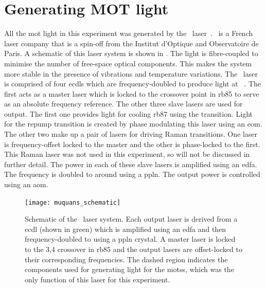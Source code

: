 \section{Generating MOT light}\label{sec:muquans_light}
 All the \ac{mot} light in this experiment was generated by the
 \Muquans\
laser~\cite{muquansWebPage}. \Muquans\ is a French laser company that is a
spin-off from the Institut d'Optique and Observatoire de Paris. A
schematic of
this laser system is shown in . The
light is fibre-coupled to minimise the number of free-space optical components.
This makes the system more stable in the presence of vibrations and
temperature variations. The \Muquans\ laser is comprised of four
\sivalue{1560}{\nano\metre} \acp{ecdl} which are frequency-doubled to produce
light at
~\cite{Menoret2011}\nocite{Leveque2014}. The first acts as a master laser
which is locked to the \trans{3}{3,4} crossover point in
\ac{rb85} to serve as an absolute frequency reference. The other three slave
lasers are used for output. The first one provides light for cooling \ac{rb87} using the  transition.
Light for the \trans{1}{2} repump transition is created by phase modulating this laser using an \ac{eom}.
The other two make up a pair of lasers for driving Raman transitions. One laser
is frequency-offset locked to the master and the other is phase-locked to the
first. This Raman laser was not used in this experiment, so will
not be discussed in further detail. The power in each of these slave lasers is amplified using
an \ac{edfa}. The frequency is doubled to around \sivalue{780}{\nano\metre} using a \ac{ppln}. The output power is controlled using an
\ac{aom}.
\begin{figure}[!htbp]
	\texttt{[image: muquans\_schematic]}
	\caption[\Muquans\ Laser System Diagram]{Schematic of the \Muquans\ laser system. Each output laser is derived from a \acs{ecdl} (shown in green) which is amplified using an \acs{edfa} and then frequency-doubled to  using a \acs{ppln} crystal. A master laser is locked to the 3,4 crossover in \ac{rb85} and the output lasers are offset-locked to their corresponding frequencies. The dashed region indicates the components used for generating light for the \acp{mots}, which was the only function of this laser for this experiment.}\label{fig:muquans_schematic}
\end{figure}
